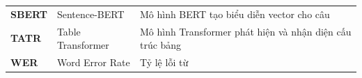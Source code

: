 \documentclass[../DoAn.tex]{subfiles}
\begin{document}
\begin{longtable}{
    @{}
    >{\raggedright\arraybackslash}p{}
    >{\raggedright\arraybackslash}p{}
    >{\raggedright\arraybackslash}p{}
    @{}
}
\textbf{SBERT}
& Sentence-BERT
& Mô hình BERT tạo biểu diễn vector cho câu \\

\textbf{TATR}
& Table Transformer
& Mô hình Transformer phát hiện và nhận diện cấu trúc bảng \\

\textbf{WER}
& Word Error Rate
& Tỷ lệ lỗi từ \\

\end{longtable}
\end{document}

